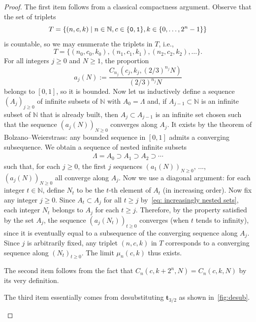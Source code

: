 \documentclass[12pt,reqno]{article}
\newcommand{\cA}{\{{\tt 0},{\tt 1}\}}
\newcommand{\N}{\mathbb{N}}
\begin{document}
\begin{proof}
    The first item follows from a classical compactness argument. Observe that the set of triplets
    \[
    T=\{(n,c,k) \mid n\in\N,  c\in\cA,  k\in\{0,\ldots,2^n-1\}\}
    \]
    is countable,  so we may enumerate the triplets in $T$,  i.e.,  
    \[
    T= \{ (n_0,c_0,k_0), (n_1,c_1,k_1),  (n_2,c_2,k_2),  \ldots \}.
    \]
    For all integers $j\ge 0$ and $N\ge 1$,  the proportion 
   \[
   a_j(N) := \frac{C_{n_j}\left(c_j,k_j,  \left(2/3\right)^{n_j} N \right)}{\left(2/3\right)^{n_j} N}
    \]
    belongs to $[0,1]$,  so it is bounded. 
    Now let us inductively define a sequence $(A_j)_{j\ge 0}$ of infinite subsets of $\N$ with $A_0 = \Lambda$ and, if $A_{j-1} \subset \N$ is an infinite subset of $\N$ that is already built,  then $A_j \subset A_{j-1}$ is  an infinite set chosen such that the sequence $(a_j(N))_{N\ge 0}$ converges along $A_j$. 
    It exists by the theorem of Bolzano--Weierstrass: any bounded sequence in $[0,1]$ admits a converging subsequence. 
    We obtain a sequence of nested infinite subsets
    \begin{align}
    \label{eq: increasingly nested sets}
    \Lambda= A_0 \supset A_1 \supset A_2 \supset \cdots
    \end{align}
    such that,  for each $j\ge 0$,  the first $j$ sequences $(a_1(N))_{N\ge 0}$,  ...,  $(a_j(N))_{N\ge 0}$ all converge along $A_j$. 
    Now we use a diagonal argument: for each integer $t\in\N$,  define $N_t$ to be the $t$-th element of $A_t$ (in increasing order). 
Now fix any integer $j\ge 0$.
Since $A_t \subset A_j$ for all $t\ge j$ by~\cref{eq: increasingly nested sets},  each integer $N_t$ belongs to $A_j$ for each $t\ge j$.
Therefore,  by the property satisfied by the set $A_j$,  the sequence $(a_j(N_t))_{t\ge 0}$ converges (when $t$ tends to infinity),  since it is eventually equal to a subsequence of the converging sequence along $A_j$.
Since $j$ is arbitrarily fixed,  any triplet $(n,c,k)$ in $T$ corresponds to a converging sequence along $(N_t)_{t\ge 0}$.
The limit $\mu_n(c,k)$  thus exists.
    
    The second item follows from the fact that $C_n(c,k + 2^n,N) = C_n(c,k,N)$ by its very definition.
    
    The third item essentially comes from desubstituting $\mathbf{t}_{3/2}$ as shown in~\cref{fig:desub}.
    \begin{figure}
      \centering
{}
\end{figure}
\end{proof}
\end{document}
